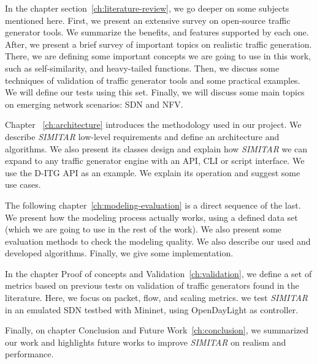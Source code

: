 In the chapter section~\ref{ch:literature-review}, we go deeper on some subjects mentioned here. First, we present an extensive survey on open-source traffic generator tools. We summarize the benefits, and features supported by each one. After, we present a brief survey of important topics on realistic traffic generation. There, we are defining some important concepts we are going to use in this work, such as self-similarity, and heavy-tailed functions. Then, we discuss some techniques of validation of traffic generator tools and some practical examples. We will define our tests using this set. Finally, we will discuss some main topics on emerging network scenarios: SDN and NFV.

Chapter ~\ref{ch:architecture} introduces the methodology used in our project. We describe \textit{SIMITAR} low-level requirements and define an architecture and algorithms.  We also present its classes design and explain how \textit{SIMITAR} we can expand to any traffic generator engine with an API, CLI or script interface. We use the D-ITG API as an example. We explain its operation and suggest some use cases.

The following chapter~\ref{ch:modeling-evaluation} is a direct sequence of the last. We present how the modeling process actually works, using a defined data set (which we are going to use in the rest of the work). We also present some evaluation methods to check the modeling quality. We also describe our used and developed algorithms. Finally, we give some implementation.

In the chapter Proof of concepts and Validation~\ref{ch:validation}, we define a set of metrics based on previous tests on validation of traffic generators found in the literature. Here, we focus on packet, flow, and scaling metrics. we test \textit{SIMITAR} in an emulated SDN testbed with Mininet, using OpenDayLight as controller\cite{web-opendaylight}. 
 

Finally, on chapter Conclusion and Future Work~\ref{ch:conclusion}, we summarized our work and highlights future works to improve \textit{SIMITAR} on realism and performance.

